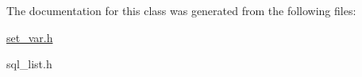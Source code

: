 The documentation for this class was generated from the following files\+:\begin{DoxyCompactItemize}
\item 
\mbox{\hyperlink{set__var_8h}{set\+\_\+var.\+h}}\item 
sql\+\_\+list.\+h\end{DoxyCompactItemize}
